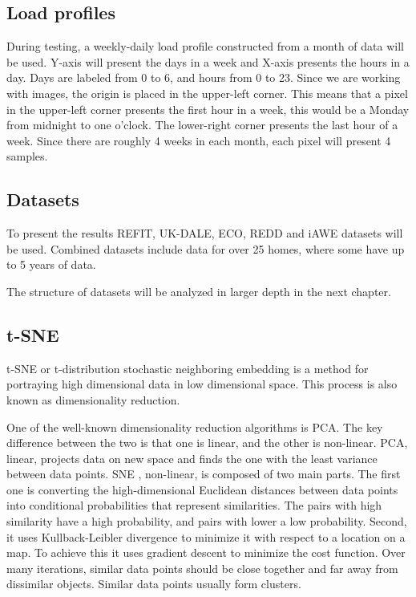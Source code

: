 \subsection{Load profiles}

During testing, a weekly-daily load profile constructed from a month of data will be used.
Y-axis will present the days in a week and X-axis presents the hours in a day.
Days are labeled from 0 to 6, and hours from 0 to 23.
Since we are working with images, the origin is placed in the upper-left corner. 
This means that a pixel in the upper-left corner presents the first hour in a week,
this would be a Monday from midnight to one o'clock. 
The lower-right corner presents the last hour of a week.
Since there are roughly 4 weeks in each month, each pixel will present 4 samples. 

\subsection{Datasets}

To present the results REFIT, UK-DALE, ECO, REDD and iAWE datasets will be used.
Combined datasets include data for over 25 homes, where some have up to 5 years of data. 

The structure of datasets will be analyzed in larger depth in the next chapter. 
\subsection{t-SNE}

t-SNE \cite{tsne2} or t-distribution stochastic neighboring embedding is a method for portraying high dimensional 
data in low dimensional space. This process is also known as dimensionality reduction.

One of the well-known dimensionality reduction algorithms is PCA.
The key difference between the two is that one is linear, and the other is non-linear.
PCA, linear, projects data on new space and finds the one with the least variance between data points.
SNE \cite{sne1}, non-linear, is composed of two main parts. The first one is 
converting the high-dimensional Euclidean distances between data points into conditional probabilities that represent similarities. \cite{sne1}
The pairs with high similarity have a high probability, and pairs with lower a low probability.
Second, it uses Kullback-Leibler divergence to minimize it with respect to a location on a map.
To achieve this it uses gradient descent to minimize the cost function.
Over many iterations, similar data points should be close together and far away from dissimilar objects.
Similar data points usually form clusters. 

